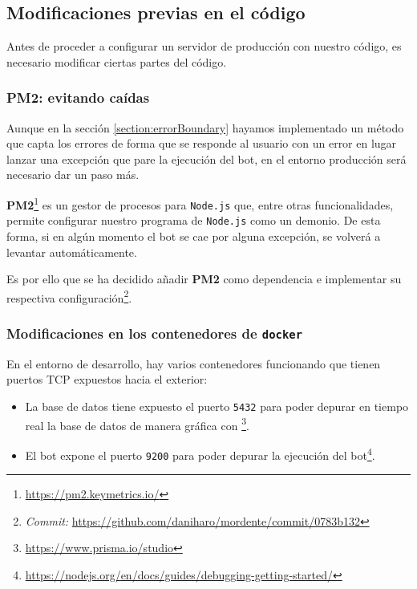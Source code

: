 \subsection{Modificaciones previas en el código}

Antes de proceder a configurar un servidor de producción con nuestro código, es necesario modificar ciertas partes del código.

\subsubsection{PM2: evitando caídas}

Aunque en la sección \ref{section:errorBoundary} hayamos implementado un método que capta los errores de forma que se responde al usuario con un error en lugar lanzar una excepción que pare la ejecución del bot, en el entorno producción será necesario dar un paso más.

\textbf{PM2}\footnote{\url{https://pm2.keymetrics.io/}} es un gestor de procesos para \texttt{Node.js} que, entre otras funcionalidades, permite configurar nuestro programa de \texttt{Node.js} como un demonio. De esta forma, si en algún momento el bot se cae por alguna excepción, se volverá a levantar automáticamente.

Es por ello que se ha decidido añadir \textbf{PM2} como dependencia e implementar su respectiva configuración\footnote{\textit{Commit:} \url{https://github.com/daniharo/mordente/commit/0783b132}}.

\subsubsection{Modificaciones en los contenedores de \texttt{docker}}

En el entorno de desarrollo, hay varios contenedores funcionando que tienen puertos TCP expuestos hacia el exterior:

\begin{itemize}
    \item La base de datos tiene expuesto el puerto \texttt{5432} para poder depurar en tiempo real la base de datos de manera gráfica con \footnote{\url{https://www.prisma.io/studio}}.
    \item El bot expone el puerto \texttt{9200} para poder depurar la ejecución del bot\footnote{\url{https://nodejs.org/en/docs/guides/debugging-getting-started/}}.
\end{itemize}

